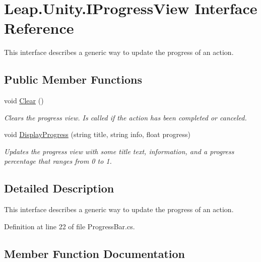 \hypertarget{interface_leap_1_1_unity_1_1_i_progress_view}{}\section{Leap.\+Unity.\+I\+Progress\+View Interface Reference}
\label{interface_leap_1_1_unity_1_1_i_progress_view}


This interface describes a generic way to update the progress of an action.  


\subsection*{Public Member Functions}
\begin{DoxyCompactItemize}
\item 
void \mbox{\hyperlink{interface_leap_1_1_unity_1_1_i_progress_view_a46a2ab798cf5fcdec6cea7065ba1b384}{Clear}} ()
\begin{DoxyCompactList}\small\item\em Clears the progress view. Is called if the action has been completed or canceled. \end{DoxyCompactList}\item 
void \mbox{\hyperlink{interface_leap_1_1_unity_1_1_i_progress_view_aaa6759b57d4c327ffc05da272ec5fe57}{Display\+Progress}} (string title, string info, float progress)
\begin{DoxyCompactList}\small\item\em Updates the progress view with some title text, information, and a progress percentage that ranges from 0 to 1. \end{DoxyCompactList}\end{DoxyCompactItemize}


\subsection{Detailed Description}
This interface describes a generic way to update the progress of an action. 



Definition at line 22 of file Progress\+Bar.\+cs.



\subsection{Member Function Documentation}
\mbox{\label{interface_leap_1_1_unity_1_1_i_progress_view_a46a2ab798cf5fcdec6cea7065ba1b384}} 
